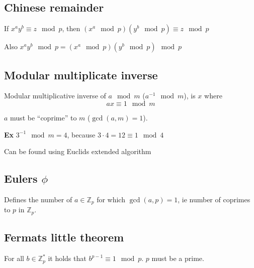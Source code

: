 \subsection{Chinese remainder}
If $x^ay^b \equiv z \mod p$, then $(x^a \mod p)(y^b \mod p) \equiv z \mod p$

Also $x^ay^b \mod p = (x^a \mod p)(y^b \mod p) \mod p$

\subsection{Modular multiplicate inverse}
Modular multiplicative inverse of $a \mod m$ ($a^{-1} \mod m$), is $x$ where
\[
ax \equiv 1 \mod m
\]

$a$ must be ``coprime'' to $m$ ($\gcd(a, m) = 1$).

\textbf{Ex} $3^{-1} \mod m = 4$, because $3 \cdot 4 = 12 \equiv 1 \mod 4$

Can be found using Euclids extended algorithm


\subsection{Eulers $\phi$}
Defines the number of $a \in \mathbb{Z}_p$ for which $\gcd(a, p) = 1$, ie number of coprimes to $p$ in $\mathbb{Z}_p$.

\subsection{Fermats little theorem}
\label{sec:fermats-little}
For all $b \in \mathbb{Z}_p^*$ it holds that $b^{p-1} \equiv 1 \mod
p$. $p$ must be a prime.
